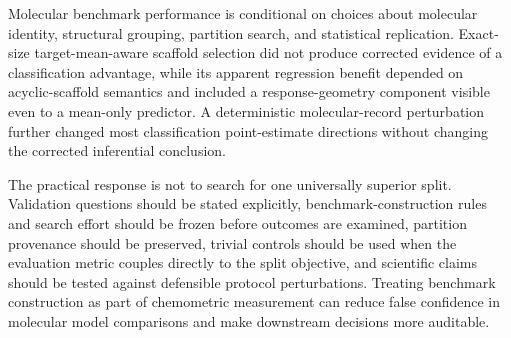 Molecular benchmark performance is conditional on choices about molecular identity, structural grouping, partition search, and statistical replication. Exact-size target-mean-aware scaffold selection did not produce corrected evidence of a classification advantage, while its apparent regression benefit depended on acyclic-scaffold semantics and included a response-geometry component visible even to a mean-only predictor. A deterministic molecular-record perturbation further changed most classification point-estimate directions without changing the corrected inferential conclusion.

The practical response is not to search for one universally superior split. Validation questions should be stated explicitly, benchmark-construction rules and search effort should be frozen before outcomes are examined, partition provenance should be preserved, trivial controls should be used when the evaluation metric couples directly to the split objective, and scientific claims should be tested against defensible protocol perturbations. Treating benchmark construction as part of chemometric measurement can reduce false confidence in molecular model comparisons and make downstream decisions more auditable.
